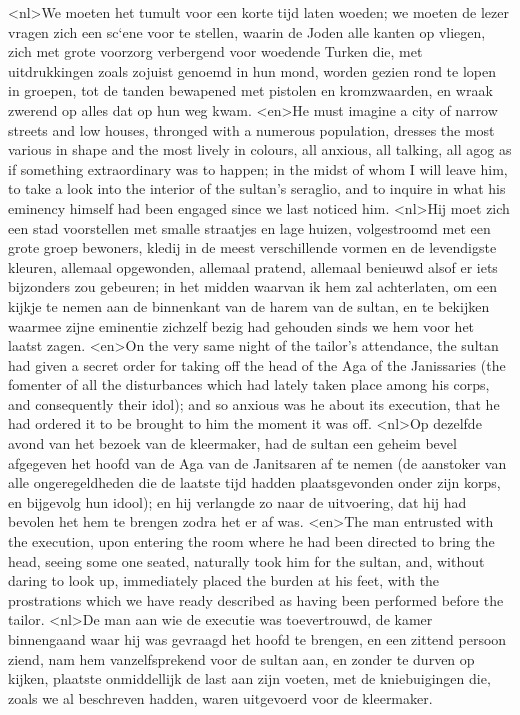 <nl>We moeten het tumult voor een korte tijd laten woeden; we moeten de lezer vragen zich een sc`ene voor te stellen, waarin de Joden alle kanten op vliegen, zich met grote voorzorg verbergend voor woedende Turken die, met uitdrukkingen  zoals zojuist genoemd in hun mond, worden gezien rond te lopen in groepen, tot de tanden bewapened met pistolen en kromzwaarden, en wraak zwerend op alles dat op hun weg kwam.
<en>He must imagine a city of narrow streets and low houses, thronged with a numerous population, dresses the most various in shape and the most lively in colours, all anxious, all talking, all agog as if something extraordinary was to happen; in the midst of whom I will leave him, to take a look into the interior of the sultan's seraglio, and to inquire in what his eminency himself had been engaged since we last noticed him.
<nl>Hij moet zich een stad voorstellen met smalle straatjes en lage huizen, volgestroomd met een grote groep bewoners, kledij in de meest verschillende vormen en de levendigste kleuren, allemaal opgewonden, allemaal pratend, allemaal benieuwd alsof er iets bijzonders zou gebeuren; in het midden waarvan ik hem zal achterlaten, om een kijkje te nemen aan de binnenkant van de harem van de sultan, en te bekijken waarmee zijne eminentie zichzelf bezig had gehouden sinds we hem voor het laatst zagen.
<en>On the very same night of the tailor's attendance, the sultan had given a secret order for taking off the head of the Aga of the Janissaries (the fomenter of all the disturbances which had lately taken place among his corps, and consequently their idol); and so anxious was he about its execution, that he had ordered it to be brought to him the moment it was off.
<nl>Op dezelfde avond van het bezoek van de kleermaker, had de sultan een geheim bevel afgegeven het hoofd van de Aga van de Janitsaren  af te nemen (de aanstoker van alle ongeregeldheden die de laatste tijd hadden plaatsgevonden onder zijn korps, en bijgevolg hun idool); en hij verlangde zo naar de uitvoering, dat hij had bevolen  het hem te brengen zodra het er af was.
<en>The man entrusted with the execution, upon entering the room where he had been directed to bring the head, seeing some one seated, naturally took him for the sultan, and, without daring to look up, immediately placed the burden at his feet, with the prostrations which we have ready described as having been performed before the tailor.
<nl>De man aan wie de executie was toevertrouwd,  de kamer binnengaand  waar hij was gevraagd  het hoofd te brengen, en een zittend persoon  ziend, nam hem vanzelfsprekend voor de sultan aan, en zonder te durven  op kijken, plaatste onmiddellijk de last aan zijn voeten, met de kniebuigingen die, zoals we al  beschreven hadden, waren  uitgevoerd voor de kleermaker.
